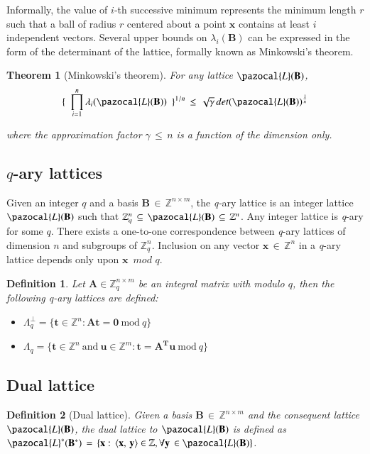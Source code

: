\documentclass[10pt]{elsarticle}
\newtheorem{theorem}{Theorem}
\newtheorem{definition}{Definition}
\begin{document}
Informally, the value of $i$-th successive minimum represents the
minimum length $r$ such that a ball of radius $r$ centered about a
point $\mathbf{x}$ contains at least $i$ independent vectors.
Several upper bounds on $\lambda_{i}(\mathbf{B})$ can be expressed
in the form of the determinant of the lattice, formally known as
Minkowski's theorem.

\begin{theorem}[Minkowski's theorem]
\normalfont For any lattice $\pazocal{L}(\mathbf{B})$,
$$ \{ \, \, \, \prod_{i=1}^{n} \lambda_{i}(\pazocal{L}(\mathbf{B})) \, \, \,   \}^{1/n} \, \leq \, \sqrt{\gamma} \,  det(\pazocal{L}(\mathbf{B}))^{\frac{1}{n}}$$

where the approximation factor $\gamma \, \leq \, n$ is a function of the dimension only.
\end{theorem}

\subsection{$q$-ary lattices}
Given an integer $q$ and a basis $\mathbf{B} \, \in \, \mathbb{Z}^{n
\times m}$, the \textit{q-}ary lattice is an integer lattice
$\pazocal{L}(\mathbf{B})$ such that $\mathbb{Z}^{n}_{q}\, \subseteq
\, \pazocal{L}(\mathbf{B}) \, \subseteq \, \mathbb{Z}^{n}$. Any
integer lattice is \textit{q}-ary for some $q$. There exists a
one-to-one correspondence between \textit{q}-ary lattices of
dimension $n$ and subgroups of $\mathbb{Z}^{n}_{q}$. Inclusion on
any vector $\mathbf{x} \, \in \, \mathbb{Z}^{n}$ in a \textit{q}-ary
lattice depends only upon $\mathbf{x} \, \, \, mod \, \, q$.
\begin{definition}
\normalfont Let $\mathbf{A}\in\mathbb{Z}_{q}^{n\times m}$ be an
integral matrix with modulo $q$, then the following \textit{q-ary}
lattices are defined:
\begin{itemize}
\item[]$\Lambda_{q}^{\perp} = \{\mathbf{t}\in\mathbb{Z}^{n}:\mathbf{A}\mathbf{t} = \mathbf{0}~\mbox{mod}~q\}$
\item[]$\Lambda_{q} = \{\mathbf{t}\in\mathbb{Z}^{n}~\mbox{and}~\mathbf{u}\in\mathbb{Z}^{m}:\mathbf{t} = \mathbf{A^T}\mathbf{u}~\mbox{mod}~q\}$
\end{itemize}
\end{definition}


\subsection{Dual lattice}
\begin{definition}[Dual lattice]
\normalfont  Given a basis $\mathbf{B} \, \in \, \mathbb{Z}^{n
\times m}$ and the consequent lattice $\pazocal{L}(\mathbf{B})$, the
dual lattice to $\pazocal{L}(\mathbf{B})$ is defined as
$\pazocal{L}^{*}(\mathbf{B}^{*}) \, = \, \{\mathbf{x}: \, \langle
\mathbf{x}, \, \mathbf{y} \rangle \in \mathbb{Z}, \forall \mathbf{y}
\, \in \pazocal{L}(\mathbf{B}) \}$.
\end{definition}
\end{document}
